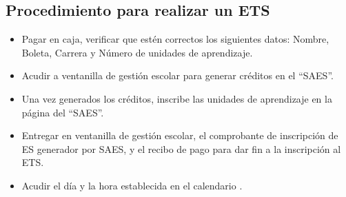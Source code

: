\subsection{Procedimiento para realizar un ETS}
\begin{itemize}
	\item Pagar en caja, verificar que estén correctos los siguientes datos: Nombre, Boleta, Carrera y Número de unidades de aprendizaje.
	\item Acudir a ventanilla de gestión escolar para generar créditos en el “SAES”.
	\item Una vez generados los créditos, inscribe las unidades de aprendizaje en la página del “SAES”.
	\item Entregar en ventanilla de gestión escolar, el comprobante de inscripción de ES generador por SAES, y el recibo de pago para dar fin a la inscripción al ETS. 
	\item  Acudir el día y la hora establecida en el calendario \cite{ref9}.
\end{itemize}